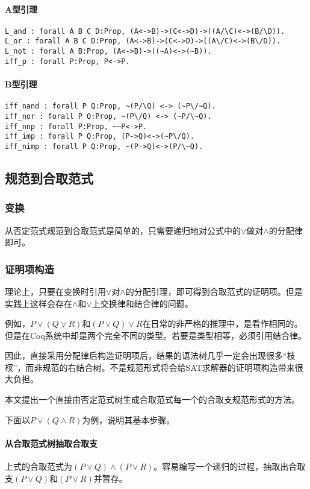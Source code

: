 \paragraph{A型引理}
\begin{verbatim}
L_and : forall A B C D:Prop, (A<->B)->(C<->D)->((A/\C)<->(B/\D)).
L_or : forall A B C D:Prop, (A<->B)->(C<->D)->((A\/C)<->(B\/D)).
L_not : forall A B:Prop, (A<->B)->((~A)<->(~B)).
iff_p : forall P:Prop, P<->P.
\end{verbatim}

\paragraph{B型引理}
\begin{verbatim}
iff_nand : forall P Q:Prop, ~(P/\Q) <-> (~P\/~Q).
iff_nor : forall P Q:Prop, ~(P\/Q) <-> (~P/\~Q).
iff_nnp : forall P:Prop, ~~P<->P.
iff_imp : forall P Q:Prop, (P->Q)<->(~P\/Q).
iff_nimp : forall P Q:Prop, ~(P->Q)<->(P/\~Q).
\end{verbatim}

\subsection{规范到合取范式}
\subsubsection{变换}
从否定范式规范到合取范式是简单的，只需要递归地对公式中的$\lor$做对$\land$的分配律即可。

\subsubsection{证明项构造}
理论上，只要在变换时引用$\lor$对$\land$的分配引理，即可得到合取范式的证明项。但是实践上这样会存在$\land$和$\lor$上交换律和结合律的问题。

例如，$P \lor (Q \lor R)$和$(P \lor Q) \lor R$在日常的非严格的推理中，是看作相同的。但是在Coq系统中却是两个完全不同的类型。若要是类型相等，必须引用结合律。

因此，直接采用分配律后构造证明项后，结果的语法树几乎一定会出现很多“枝杈”，而非规范的右结合树。不是规范形式将会给SAT求解器的证明项构造带来很大负担。

本文提出一个直接由否定范式树生成合取范式每一个的合取支规范形式的方法。

下面以$P \lor (Q \land R)$为例，说明其基本步骤。

\paragraph{从合取范式树抽取合取支}
上式的合取范式为$(P \lor Q) \land (P \lor R)$。容易编写一个递归的过程，抽取出合取支$(P \lor Q)$和$(P \lor R)$并暂存。

